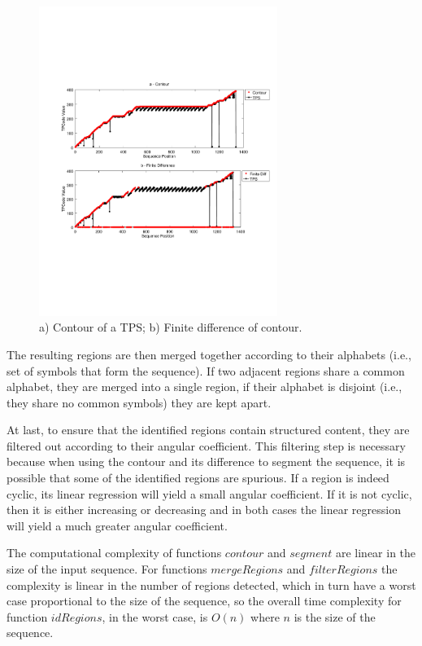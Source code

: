 \begin{figure}[h]
  \centering
     \includegraphics[trim={2.5cm 7.5cm 1cm 6.5cm}, width=220pt
     ]{img/contour.pdf}
  \caption{\small{a) Contour of a TPS; b) Finite difference of contour.}}
  \label{fig:contour}
\end{figure}


The resulting regions are then merged together according to their alphabets
(i.e., set of symbols that form the sequence). If two adjacent regions share a
common alphabet, they are merged into a single region, if their alphabet is
disjoint (i.e., they share no common symbols) they are kept apart.

At last, to ensure that the identified regions contain structured content, they
are filtered out according to their angular coefficient. This filtering step is
necessary because when using the contour and its difference to segment the
sequence, it is possible that some of the identified regions are spurious. If a
region is indeed cyclic, its linear regression will yield a small angular
coefficient. If it is not cyclic, then it is either increasing or decreasing and
in both cases the linear regression will yield a much greater angular
coefficient.

The computational complexity of functions $contour$ and $segment$ are linear in
the size of the input sequence. For functions $mergeRegions$ and $filterRegions$
the complexity is linear in the number of regions detected, which in turn have a
worst case proportional to the size of the sequence, so the overall time
complexity for function $idRegions$, in the worst case, is $O(n)$ where $n$ is
the size of the sequence.


